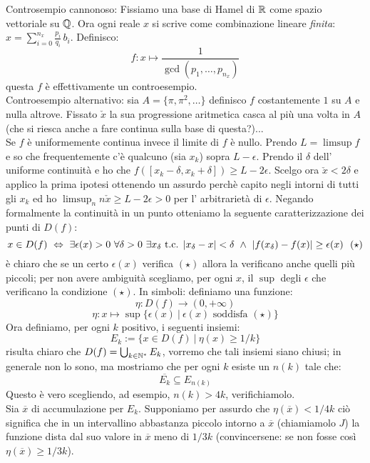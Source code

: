 Controsempio cannonoso: Fissiamo una base di Hamel di $\mathbb{R}$ come spazio vettoriale su $\mathbb{Q}$. Ora ogni reale $x$ si scrive come combinazione lineare {\it finita}: $x=\sum_{i=0}^{n_x} \frac{p_i}{q_i}\, b_i$. Definisco:
$$ f:x\mapsto \frac{1}{\gcd(p_1,\ldots,p_{n_x})} $$ 
questa $f$ è effettivamente un controesempio.\\
Controesempio alternativo: sia $A=\{\pi,\pi^2,\ldots\}$ definisco $f$ costantemente $1$ su $A$ e nulla altrove. Fissato $\check{x}$ la sua progressione aritmetica casca al più una volta in $A$ (che si riesca anche a fare continua sulla base di questa?)...\\
Se $f$ è uniformemente continua invece il limite di $f$ è nullo. Prendo $L=\limsup f$ e so che frequentemente c'è qualcuno (sia $x_k$) sopra $L-\epsilon$. Prendo il $\delta$ dell' uniforme continuità e ho che $f([x_k-\delta,x_k+\delta])\ge L-2\epsilon$. Scelgo ora $\check{x}<2\delta$ e applico la prima ipotesi ottenendo un assurdo perchè capito negli intorni di tutti gli $x_k$ ed ho $\limsup_n n\check{x}\ge L-2\epsilon>0$ per l' arbitrarietà di $\epsilon$.
 Negando formalmente la continuità in un punto otteniamo la seguente caratterizzazione dei punti di $D(f)$:
$$
x\in D(f)\ \Leftrightarrow\  \exists \epsilon(x)>0\  \forall \delta>0\  \exists x_\delta \mbox{ t.c. } \vert{x_\delta-x}\vert<\delta\  \wedge\   \vert{f(x_\delta)-f(x)}\vert\geq \epsilon(x)\ \ (\star)
$$
è chiaro che se un certo $\epsilon(x)$ verifica $(\star)$ allora la verificano anche quelli più piccoli; per non avere ambiguità scegliamo, per ogni $x$, il $\sup$ degli $\epsilon$ che verificano la condizione $(\star)$. In simboli: definiamo una funzione:
$$
\eta: D(f)\rightarrow (0,+\infty)
$$
$$
\eta: x\mapsto \sup\{\epsilon(x)\ \vert\ \epsilon(x) \mbox{ soddisfa } (\star) \}
$$
Ora definiamo, per ogni $k$ positivo, i seguenti insiemi:
$$
E_k:=\{x\in D(f)\ \vert\  \eta(x)\geq 1/k \}
$$
risulta chiaro che $D(f)=\bigcup_{k\in\mathbb{N}^{*}} E_k$, vorremo che tali insiemi siano chiusi; in generale non lo sono, ma mostriamo che per ogni $k$ esiste un $n(k)$ tale che:
$$
\overline{E_k}\subseteq E_{n(k)}
$$
Questo è vero scegliendo, ad esempio, $n(k)>4k$, verifichiamolo.\\
Sia $\overline{x}$ di accumulazione per $E_k$. Supponiamo per assurdo che $\eta(\overline{x})<1/4k$ ciò significa che in un intervallino abbastanza piccolo intorno a $\overline{x}$ (chiamiamolo $J$) la funzione dista dal suo valore in $\overline{x}$ meno di $1/3k$ (convincersene: se non fosse così $\eta(\overline{x})\geq 1/3k$).\\
